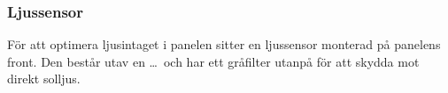        \subsubsection{Ljussensor} %
        \label{ssub:ljussensor}
            För att optimera ljusintaget i panelen sitter en ljussensor monterad på panelens front.  Den består utav en \dots\ och har ett gråfilter utanpå för att skydda mot direkt solljus. 
        
